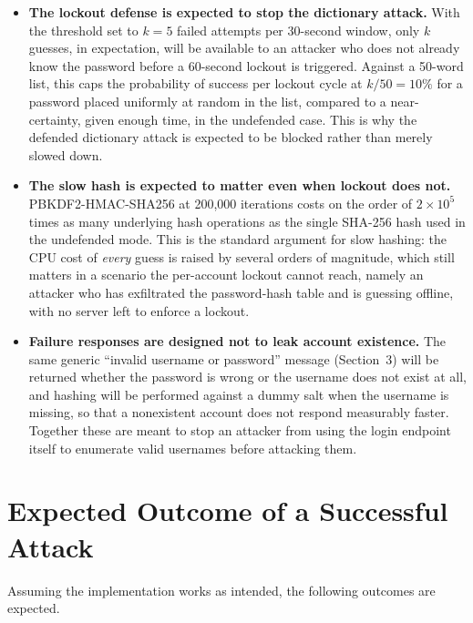 \documentclass[11pt]{article}
\begin{document}
\begin{itemize}[leftmargin=*]
    being taken.
  \item \textbf{The lockout defense is expected to stop the dictionary attack.}
    With the threshold set to $k=5$ failed attempts per 30-second window, only
    $k$ guesses, in expectation, will be available to an attacker who does not
    already know the password before a 60-second lockout is triggered. Against a
    50-word list, this caps the probability of success per lockout cycle at
    $k/50 = 10\%$ for a password placed uniformly at random in the list,
    compared to a near-certainty, given enough time, in the undefended case.
    This is why the defended dictionary attack is expected to be blocked rather
    than merely slowed down.
  \item \textbf{The slow hash is expected to matter even when lockout does not.}
    PBKDF2-HMAC-SHA256 at 200{,}000 iterations costs on the order of
    $2\times10^5$ times as many underlying hash operations as the single
    SHA-256 hash used in the undefended mode. This is the standard argument for
    slow hashing: the CPU cost of \emph{every} guess is raised by several orders
    of magnitude, which still matters in a scenario the per-account lockout
    cannot reach, namely an attacker who has exfiltrated the password-hash table
    and is guessing offline, with no server left to enforce a lockout.
  \item \textbf{Failure responses are designed not to leak account existence.}
    The same generic ``invalid username or password'' message (Section~3) will
    be returned whether the password is wrong or the username does not exist at
    all, and hashing will be performed against a dummy salt when the username is
    missing, so that a nonexistent account does not respond measurably faster.
    Together these are meant to stop an attacker from using the login endpoint
    itself to enumerate valid usernames before attacking them.
\end{itemize}

\section{Expected Outcome of a Successful Attack}

Assuming the implementation works as intended, the following outcomes are expected.
\end{document}
